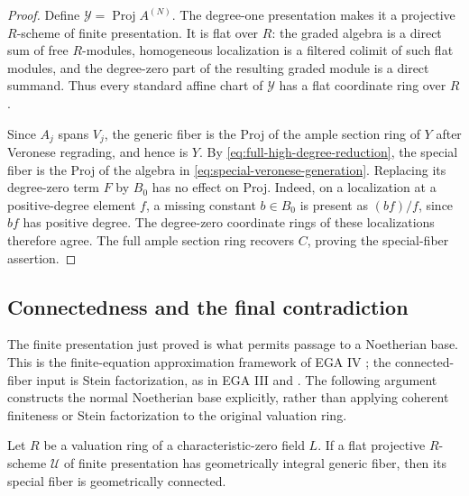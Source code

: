 \begin{proof}
Define $\mathcal Y=\operatorname{Proj}A^{(N)}$. The degree-one
presentation makes it a projective $R$-scheme of finite presentation.
It is flat over $R$: the graded algebra is a direct sum of free
$R$-modules, homogeneous localization is a filtered colimit of such
flat modules, and the degree-zero part of the resulting graded module
is a direct summand. Thus every standard affine chart of $\mathcal Y$
has a flat coordinate ring over $R$.

Since $A_j$ spans $V_j$, the generic fiber is the Proj of the ample
section ring of $Y$ after Veronese regrading, and hence is $Y$.
By \eqref{eq:full-high-degree-reduction}, the special fiber is the
Proj of the algebra in \eqref{eq:special-veronese-generation}.
Replacing its degree-zero term $F$ by $B_0$ has no effect on Proj.
Indeed, on a localization at a positive-degree element $f$, a missing
constant $b\in B_0$ is present as $(bf)/f$, since $bf$ has positive
degree. The degree-zero coordinate rings of these localizations
therefore agree. The full ample section ring recovers $C$, proving
the special-fiber assertion.
\end{proof}

\subsection{Connectedness and the final contradiction}

The finite presentation just proved is what permits passage to a
Noetherian base. This is the finite-equation approximation framework
of EGA IV \cite[Section~8]{EGAIV3}; the connected-fiber input is Stein
factorization, as in EGA III \cite[Section~4.3]{EGAIII1} and
. The following argument constructs
the normal Noetherian base explicitly, rather than applying coherent
finiteness or Stein factorization to the original valuation ring.

\begin{lemma}\label{lem:valuation-model-connectedness}
Let $R$ be a valuation ring of a characteristic-zero field $L$.
If a flat projective $R$-scheme $\mathcal U$ of finite presentation
has geometrically integral generic fiber, then its special fiber
is geometrically connected.
\end{lemma}

